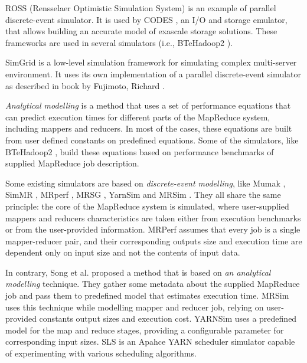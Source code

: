 \documentclass[conference]{IEEEtran} \IEEEoverridecommandlockouts
\begin{document}
    ROSS \cite{ross} (Rensselaer Optimistic Simulation System) is an example of parallel
    discrete-event simulator. It is used by CODES \cite{codes}, an I/O and storage emulator,
    that allows building an accurate model of exascale storage solutions. These
    frameworks are used in several simulators (i.e., BTeHadoop2 \cite{baseline_model}).

    SimGrid \cite{simgrid} is a low-level simulation framework for simulating complex 
    multi-server environment. It uses its own implementation of a parallel discrete-event simulator as described in book by Fujimoto, Richard \cite{fujimoto_parallel_1990}.

    \textit{Analytical modelling} is a method that uses a set of performance
    equations that can predict execution times for different parts of the
    MapReduce system, including mappers and reducers. In most of the cases,
    these equations are built from user defined constants on predefined
    equations. Some of the simulators, like BTeHadoop2 \cite{baseline_model}, build these equations
    based on performance benchmarks of supplied MapReduce job description.

    Some existing simulators are based on \textit{discrete-event modelling},
    like Mumak \cite{mumak}, SimMR \cite{simmr}, MRperf \cite{mrperf}, MRSG , YarnSim \cite{yarnsim} and MRSim \cite{mrsim}. They all share the same
    principle: the core of the MapReduce system is simulated, where
    user-supplied mappers and reducers characteristics are taken either from
    execution benchmarks or from the user-provided information. MRPerf assumes
    that every job is a single mapper-reducer pair, and their corresponding
    outputs size and execution time are dependent only on input size and not
    the contents of input data. 

    In contrary, Song et al. \cite{song} proposed a method that is based on \textit{an
    analytical modelling} technique. They gather some metadata about the
    supplied MapReduce job and pass them to predefined model that estimates
    execution time. MRSim uses this technique while modelling mapper and
    reducer job, relying on user-provided constants output sizes and execution
    cost. YARNSim uses a predefined model for the map and reduce stages,
    providing a configurable parameter for corresponding input sizes. SLS \cite{sls} 
    is an Apahce YARN\cite{apache_yarn} scheduler simulator capable of experimenting with various scheduling 
    algorithms.
\end{document}
